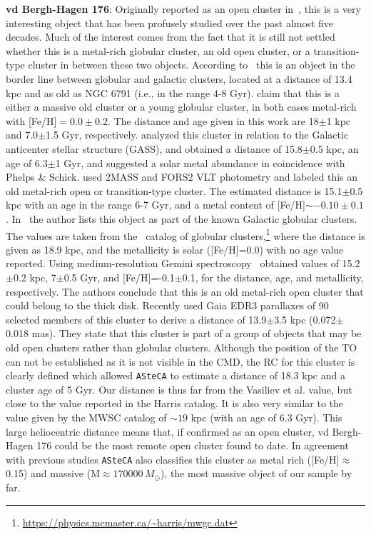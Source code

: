 \documentclass[referee]{aa}
\begin{document}
\begin{appendix}
  \noindent \textbf{vd Bergh-Hagen 176}: Originally reported as an open cluster
  in~\cite{vandenBergh_1975}, this is a very interesting object that has been
  profusely studied over the past almost five decades. Much of the interest
  comes from the fact that it is still not settled whether this is a metal-rich
  globular cluster, an old open cluster, or a transition-type cluster in between
  these two objects.
  According to~\cite{Ortolani_1995} this is an object in the border line
  between globular and galactic clusters, located at a distance of 13.4 kpc
  and as old as NGC 6791 (i.e., in the range 4-8 Gyr).
  \cite{Phelps_2003} claim that this is a either a massive old cluster or a
  young globular cluster, in both cases metal-rich with [Fe/H]$=0.0\pm0.2$.
  The distance and age given in this work are 18$\pm$1 kpc and 7.0$\pm$1.5 Gyr,
  respectively.
  \cite{Frinchaboy_2006} analyzed this cluster in relation to the Galactic
  anticenter stellar structure (GASS), and obtained a distance of 15.8$\pm$0.5
  kpc, an age of 6.3$\pm$1 Gyr, and suggested a solar metal abundance in
  coincidence with Phelps \& Schick.
  \cite{Davoust_2011} used 2MASS and FORS2 VLT photometry and labeled this an
  old metal-rich open or transition-type cluster. The estimated  distance is
  15.1$\pm$0.5 kpc with an age in the range 6-7 Gyr, and a metal content of
  [Fe/H]$\sim-0.10\pm0.1$.
  In~\cite{vandenBergh_2011} the author lists this object as part of the known
  Galactic globular clusters. The values are taken from
  the~\cite{Harris_1996,Harris_2010} catalog of globular
  clusters,\footnote{\url{https://physics.mcmaster.ca/~harris/mwgc.dat}}
  where the distance is given as 18.9 kpc,
  and the metallicity is solar ([Fe/H]=0.0) with no age value reported.
  Using medium-resolution Gemini spectroscopy~\cite{Sharina_2014} obtained
  values of 15.2$\pm$0.2 kpc, 7$\pm$0.5 Gyr, and [Fe/H]=-0.1$\pm$0.1, for the
  distance, age, and metallicity, respectively. The authors conclude that this
  is an old metal-rich open cluster that could belong to the thick disk.
  Recently \cite{Vasiliev_2021} used Gaia EDR3 parallaxes of 90 selected
  members of this cluster to derive a distance of 13.9$\pm$3.5 kpc
  (0.072$\pm$0.018 mas). They state that this cluster is part of a group of
  objects that may be old open clusters rather than globular clusters.
  Although the position of the TO can not be established as it is not visible
  in the CMD, the RC for this cluster is clearly defined which allowed
  \texttt{ASteCA} to estimate a distance of 18.3 kpc and a cluster age of 5
  Gyr. Our distance is thus far from the Vasiliev et al. value, but close to the
  value reported in the Harris catalog. It is also very similar to the value
  given by the MWSC catalog of $\sim19$ kpc (with an age of 6.3 Gyr).
  This large heliocentric distance means that, if confirmed as an open
  cluster, vd Bergh-Hagen 176 could be the most remote open cluster found to
  date. In agreement with previous studies \texttt{ASteCA} also classifies this
  cluster as metal rich ([Fe/H]$\approx$0.15) and massive (M$\approx170000\,
  M_{\odot}$), the most massive object of our sample by far.\\


\end{appendix}
\end{document}
